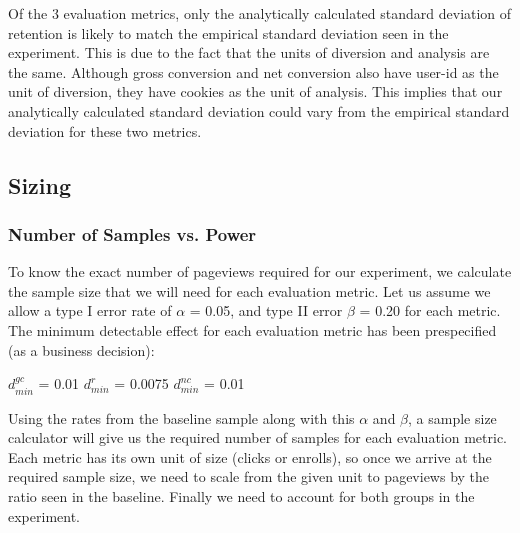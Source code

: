 \documentclass[paper=a4, fontsize=11pt]{scrartcl} %
\numberwithin{equation}{section} %
\numberwithin{figure}{section} %
\numberwithin{table}{section} %
\begin{document}
Of the 3 evaluation metrics, only the analytically calculated standard deviation of retention is likely to match the empirical standard deviation seen in the experiment.  This is due to the fact that the units of diversion and analysis are the same.  Although gross conversion and net conversion also have user-id as the unit of diversion, they have cookies as the unit of analysis.  This implies that our analytically calculated standard deviation could vary from the empirical standard deviation for these two metrics. \newline


\subsection{Sizing}

\subsubsection{Number of Samples vs. Power}


To know the exact number of pageviews required for our experiment, we calculate the sample size that we will need for each evaluation metric.  Let us assume we allow a type I error rate of $\alpha$ = 0.05, and type II error $\beta$ = 0.20 for each metric.  The minimum detectable effect for each evaluation metric has been prespecified (as a business decision): \newline

$d_{min}^{gc}$ = 0.01\quad
$d_{min}^{r}$ = 0.0075\quad
$d_{min}^{nc}$ = 0.01
\newline

Using the rates from the baseline sample along with this $\alpha$ and $\beta$, a sample size calculator
will give us the required number of samples for each evaluation metric.  Each metric has it\textquotesingle s own unit of size (clicks or enrolls), so once we arrive at the required sample size, we need to scale from the given unit to pageviews by the ratio seen in the baseline.  Finally we need to account for both groups in the experiment. \newline
\end{document}
